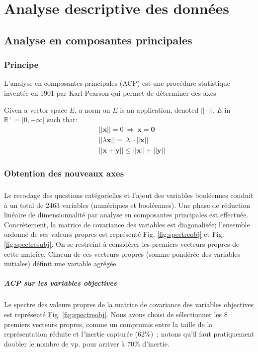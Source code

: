 \documentclass[11pt,fleqn,a4paper,openany,frenchb]{book} %
\begin{document}
\chapter{Analyse descriptive des données}
\section{Analyse en composantes principales}
\subsection{Principe}
L'analyse en composantes principales (ACP) est une procédure statistique inventée en 1901 par Karl Pearson qui permet de déterminer des axes
\begin{definition}
Given a vector space $E$, a norm on $E$ is an application, denoted $||\cdot||$, $E$ in $\mathbb{R}^+=[0,+\infty[$ such that:
\begin{align}
& ||\mathbf{x}||=0\ \Rightarrow\ \mathbf{x}=\mathbf{0}\\
& ||\lambda \mathbf{x}||=|\lambda|\cdot ||\mathbf{x}||\\
& ||\mathbf{x}+\mathbf{y}||\leq ||\mathbf{x}||+||\mathbf{y}||
\end{align}
\end{definition}
\subsection{Obtention des nouveaux axes }
\paragraph{}
Le recodage des questions catégorielles et l'ajout des variables booléennes conduit à un total de 2463 variables (numériques et booléennes). Une phase de réduction linéaire de dimensionnalité par analyse en composantes principales est effectuée. Concrètement, la matrice de covariance des variables est diagonalisée; l'ensemble ordonné de ses valeurs propres est représenté Fig. \ref{fig:spectreobj} et Fig. \ref{fig:spectresubj}. On se restreint à considérer les premiers vecteurs propres de cette matrice. Chacun de ces vecteurs propres (somme pondérée des variables initiales) définit une variable agrégée. 

\paragraph{ACP sur les variables objectives\\}
Le spectre des valeurs propres de la matrice de covariance des variables objectives est représenté Fig. \ref{fig:spectreobj}.  Nous avons choisi de sélectionner les 8 premiers vecteurs propres, comme un compromis entre la taille de la représentation réduite et l'inertie capturée (62\%)~; notons qu'il faut pratiquement doubler le nombre de vp. pour arriver à 70\% d'inertie. 
\end{document}

